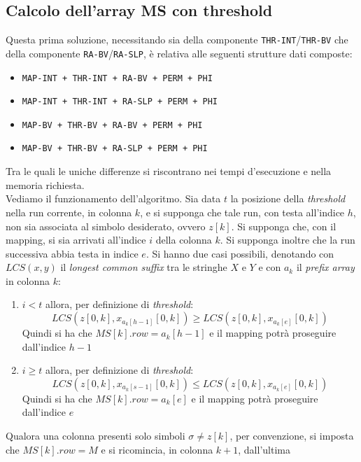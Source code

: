 \subsection{Calcolo dell'array MS con threshold}
Questa prima soluzione, necessitando sia della componente
\texttt{THR-INT}/\texttt{THR-BV} che della componente
\texttt{RA-BV}/\texttt{RA-SLP}, è relativa alle seguenti strutture dati
composte: 
\begin{itemize}
  \item \texttt{MAP-INT + THR-INT + RA-BV + PERM + PHI}
  \item \texttt{MAP-INT + THR-INT + RA-SLP + PERM + PHI}
  \item \texttt{MAP-BV + THR-BV + RA-BV + PERM + PHI}
  \item \texttt{MAP-BV + THR-BV + RA-SLP + PERM + PHI}
\end{itemize}
Tra le quali le uniche differenze si riscontrano nei tempi d'esecuzione e nella
memoria richiesta.\\
Vediamo il funzionamento dell'algoritmo.
Sia data $t$ la posizione della \textit{threshold} nella run corrente,
in colonna $k$, e
si supponga che tale run, con testa all'indice $h$, non sia associata al simbolo
desiderato, ovvero $z[k]$. Si supponga che, con il mapping, si sia arrivati
all'indice $i$ della colonna $k$. Si supponga inoltre che la run successiva
abbia testa in indice $e$. Si hanno due casi possibili, denotando con
$LCS(x,y)$ il \textit{longest common suffix} tra le stringhe $X$ e $Y$ e con
$a_k$ il \textit{prefix array} in colonna $k$:
\begin{enumerate}
  \item $i<t$ allora, per definizione di \textit{threshold}:
  \[LCS(z[0,k], x_{a_{k}[h-1]}[0,k])\geq LCS(z[0,k], x_{a_{k}[e]}[0,k])\]
  Quindi si ha che $MS[k].row=a_{k}[h-1]$ e il mapping potrà proseguire
  dall'indice $h-1$
  \item  $i\geq t$ allora, per definizione di \textit{threshold}:
  \[LCS(z[0,k], x_{a_{k}[s-1]}[0,k])\leq LCS(z[0,k], x_{a_{k}[e]}[0,k])\]
  Quindi si ha che $MS[k].row=a_{k}[e]$ e il mapping potrà proseguire
  dall'indice $e$
\end{enumerate}
Qualora una colonna presenti solo simboli $\sigma\neq z[k]$, per convenzione, si
imposta che $MS[k].row = M$ e si ricomincia, in colonna $k+1$, dall'ultima
